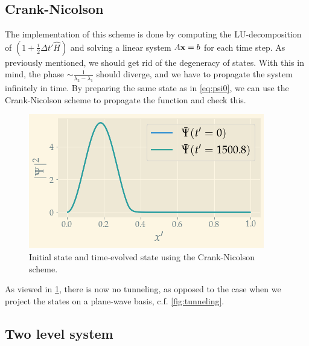  
\subsection{Crank-Nicolson}

The implementation of this scheme is done by computing the LU-decomposition of $\left(1+\frac{i}{2}\Delta t'\hat H\right)$ and solving a linear system $A\vb x= b$ for each time step. 
As previously mentioned, we should get rid of the degeneracy of states. With this in mind, the phase  $\sim \frac{1}{\lambda_2-\lambda_1}$ should diverge, and we have to propagate the system infinitely in time.  By preparing the same state as in \cref{eq:psi0}, we can use the Crank-Nicolson scheme to propagate the function and check this. 
\begin{figure}
	\centering
	\includegraphics[width=\linewidth]{img/crank.png}
	\caption{Initial state and time-evolved state using the Crank-Nicolson scheme. }
	\label{fig:crank}
\end{figure}
As viewed in \cref{fig:crank}, there is now no tunneling, as opposed to the case when we project the states on a plane-wave basis, c.f. \cref{fig:tunneling}.

\subsection{Two level system}

